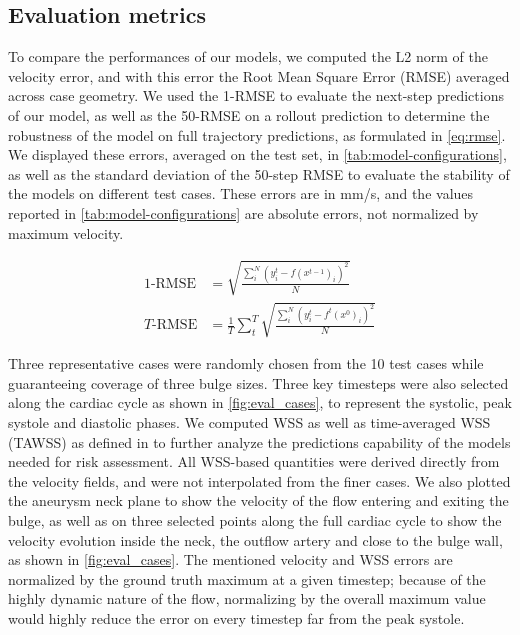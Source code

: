 \subsection{Evaluation metrics}

To compare the performances of our models, we computed the L2 norm of the velocity error, and with this error the Root Mean Square Error (RMSE) averaged across case geometry. We used the 1-RMSE to evaluate the next-step predictions of our model, as well as the 50-RMSE on a rollout prediction to determine the robustness of the model on full trajectory predictions, as formulated in \autoref{eq:rmse}. We displayed these errors, averaged on the test set, in \autoref{tab:model-configurations}, as well as the standard deviation of the 50-step RMSE to evaluate the stability of the models on different test cases. These errors are in mm/s, and the values reported in \autoref{tab:model-configurations} are absolute errors, not normalized by maximum velocity.

\begin{equation}\label{eq:rmse} 
\begin{split}
    1\textrm{-RMSE} &= \sqrt{\frac{\sum_i^N (y_i^t - f(x^{t-1})_i)^2}{N}}\\
    T\textrm{-RMSE} &= \frac{1}{T}\sum_t^T \sqrt{ \frac{\sum_i^N (y_i^t - f^t(x^0)_i)^2}{N} }
\end{split}
\end{equation}

Three representative cases were randomly chosen from the 10 test cases while guaranteeing coverage of three bulge sizes. Three key timesteps were also selected along the cardiac cycle as shown in  \autoref{fig:eval_cases}, to represent the systolic, peak systole and diastolic phases. We computed WSS as well as time-averaged WSS (TAWSS) as defined in  to further analyze the predictions capability of the models needed for risk assessment. All WSS-based quantities were derived directly from the velocity fields, and were not interpolated from the finer cases. We also plotted the aneurysm neck plane to show the velocity of the flow entering and exiting the bulge, as well as on three selected points along the full cardiac cycle to show the velocity evolution inside the neck, the outflow artery and close to the bulge wall, as shown in \autoref{fig:eval_cases}. The mentioned velocity and WSS errors are normalized by the ground truth maximum at a given timestep; because of the highly dynamic nature of the flow, normalizing by the overall maximum value would highly reduce the error on every timestep far from the peak systole.
